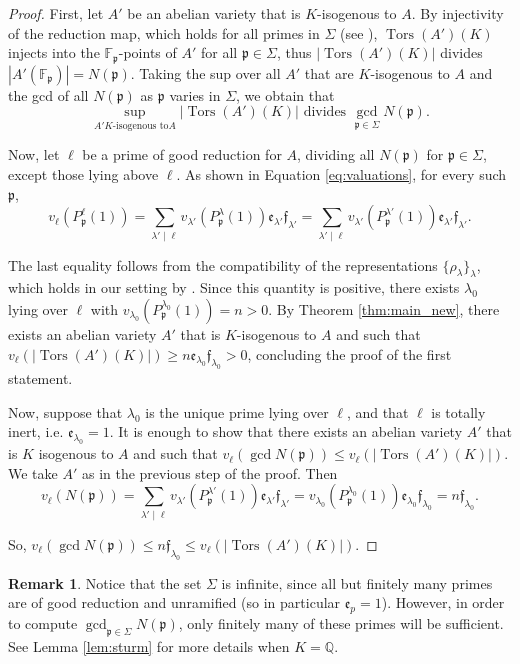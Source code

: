 \documentclass[a4paper,11pt]{amsart}
\theoremstyle{definition}
\newtheorem{remark}[theorem]{Remark}
\newcommand{\Q}{\mathbb Q}
\newcommand{\F}{\mathbb F}
\newcommand{\p}{\mathfrak{p}}
\newcommand{\f}{\mathfrak{f}}
\newcommand{\e}{\mathfrak{e}}
\DeclareMathOperator{\Tors}{Tors}
\begin{document}
\begin{proof}
First, let \(A'\) be an abelian variety that is \(K\)-isogenous to \(A\). By injectivity of the reduction map, which holds for all primes in \(\Sigma\) (see \cite[Appendix]{Katz1981GaloisVarieties}), \(\Tors(A')(K)\) injects into the \(\F_\p\)-points of \(A'\) for all \(\p \in \Sigma\), thus \(|\Tors(A')(K)|\) divides \( |A'(\F_\p)|=N(\p)\). Taking the sup over all \(A'\) that are \(K\)-isogenous to \(A\) and the gcd of all \(N(\p)\) as \(\p\) varies in \(\Sigma\), we obtain that
\[
    \sup_{A' K\text{-isogenous to} A} |\Tors(A')(K)| \text{ divides } \gcd_{\p \in \Sigma} N(\p).
    \]
 
Now, let \(\ell\) be a prime of good reduction for \(A\), dividing all \(N(\p)\) for \(\p \in \Sigma\), except those lying above \(\ell\). As shown in Equation \eqref{eq:valuations}, for every such \(\p\),
\begin{equation} 
    v_{\ell}(P_\p^{\ell}(1)) = \sum_{\lambda' \mid \ell} v_{\lambda'}(P_\p^\lambda(1)) \e_{\lambda'}\f_{\lambda'}=\sum_{\lambda' \mid \ell} v_{\lambda'}(P_\p^{\lambda'}(1)) \e_{\lambda'}\f_{\lambda'}.
\end{equation}

The last equality follows from the compatibility of the representations \(\{\rho_\lambda\}_\lambda\), which holds in our setting by \cite[Theorem 2.1.2]{Ribet1976GaloisMultiplications}. Since this quantity is positive, there exists \(\lambda_0\) lying over \(\ell\) with \(v_{\lambda_0}(P_\p^{\lambda_0}(1)) =n> 0\). By Theorem \ref{thm:main_new}, there exists an abelian variety \(A'\) that is \(K\)-isogenous to \(A\) and such that \(v_\ell(|\Tors(A')(K)|) \ge n \e_{\lambda_0} \f_{\lambda_0} > 0\), concluding the proof of the first statement.

Now, suppose that \(\lambda_0\) is the unique prime lying over \(\ell\), and that \(\ell\) is totally inert, i.e. \(\e_{\lambda_0}=1\). It is enough to show that there exists an abelian variety \(A'\) that is \(K\) isogenous to \(A\) and such that \(v_\ell(\gcd N(\p)) \le  v_\ell(|\Tors(A')(K)|)\). We take \(A'\) as in the previous step of the proof. Then
\[
v_\ell(N(\p))=\sum_{\lambda' \mid \ell} v_{\lambda'}(P_\p^{\lambda'}(1)) \e_{\lambda'}\f_{\lambda'} = v_{\lambda_0}(P_\p^{\lambda_0}(1))\e_{\lambda_0}\f_{\lambda_0}=n \f_{\lambda_0}.
\]

So, \(v_\ell(\gcd N(\p)) \le n \f_{\lambda_0} \le v_\ell(|\Tors(A')(K)|)\).
\end{proof}

\begin{remark}
    Notice that the set \(\Sigma\) is infinite, since all but finitely many primes are of good reduction and unramified (so in particular \(\e_p=1\)). However, in order to compute \(\gcd_{\p \in \Sigma} N(\p)\), only finitely many of these primes will be sufficient. See Lemma \ref{lem:sturm} for more details when \(K=\Q\).
\end{remark}
\end{document}
